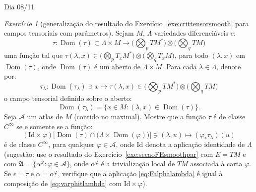 \documentclass[oneside,11pt]{amsart}
\newcommand{\Id}{\mathrm{Id}}
\DeclareMathOperator{\Dom}{Dom}
\theoremstyle{remark}\newtheorem{exercise}{Exercício}[section]
\theoremstyle{plain}\newtheorem{teo}{Teorema}[section]
\theoremstyle{plain}\newtheorem{lem}[teo]{Lema}
\theoremstyle{plain}\newtheorem{prop}[teo]{Proposição}
\theoremstyle{definition}\newtheorem{defin}[teo]{Definição}
\theoremstyle{remark}\newtheorem{rem}[teo]{Observação}
\theoremstyle{definition}\newtheorem{example}[teo]{Exemplo}
\numberwithin{equation}{section}
\begin{document}
\begin{section}{Dia 08/11}
\begin{exercise}[generalização do resultado do Exercício~\ref{exe:crittensorsmooth} para campos tensoriais com parâmetros]\label{exe:critensmoothpar}
Sejam $M$, $\Lambda$ variedades diferenciáveis e:
\[\tau:\Dom(\tau)\subset\Lambda\times M\longrightarrow\Big(\bigotimes_pTM^*\Big)\otimes\Big(\bigotimes_qTM\Big)\]
uma função tal que $\tau(\lambda,x)\in\big(\bigotimes_pT_xM^*\big)\otimes\big(\bigotimes_qT_xM\big)$, para todo $(\lambda,x)$ em $\Dom(\tau)$,
onde $\Dom(\tau)$ é um aberto de $\Lambda\times M$. Para cada $\lambda\in\Lambda$, denote por:
\[\tau_\lambda:\Dom(\tau_\lambda)\ni x\longmapsto\tau(\lambda,x)\in\big(\bigotimes_pTM^*\big)\otimes\big(\bigotimes_qTM\big)\]
o campo tensorial definido sobre o aberto:
\[\Dom(\tau_\lambda)=\big\{x\in M:(\lambda,x)\in\Dom(\tau)\big\}.\]
Seja $\mathcal A$ um atlas de $M$ (contido no maximal). Mostre que a função $\tau$ é de classe $C^\infty$ se e somente se
a função:
\begin{equation}\label{eq:varphitlambda}
(\Id\times\varphi)\big[\Dom(\tau)\cap\big(\Lambda\times\Dom(\varphi)\big)\big]\ni(\lambda,u)\longmapsto(\varphi_*\tau_\lambda)(u)
\end{equation}
é de classe $C^\infty$, para qualquer $\varphi\in\mathcal A$, onde $\Id$ denota a aplicação identidade de $\Lambda$ (sugestão: use o resultado
do Exercício~\ref{exe:secaoFEsmoothpar} com $E=TM$ e com $\mathfrak A=\big\{\alpha^\varphi:\varphi\in\mathcal A\big\}$, onde $\alpha^\varphi$ é a trivialização
local de $TM$ associada à carta $\varphi$. Se $\epsilon=\tau$ e $\alpha=\alpha^\varphi$, verifique que a aplicação \eqref{eq:Falphalambda} é
igual à composição de \eqref{eq:varphitlambda} com $\Id\times\varphi$).
\end{exercise}


\end{section}
\end{document}
